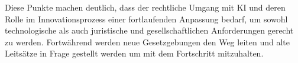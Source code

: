 Diese Punkte machen deutlich, 
dass der rechtliche Umgang mit KI und deren Rolle 
im Innovationsprozess einer fortlaufenden Anpassung bedarf, 
um sowohl technologische 
als auch juristische und gesellschaftlichen
Anforderungen gerecht zu werden. Fortwährend werden
neue Gesetzgebungen den Weg leiten und alte Leitsätze 
in Frage gestellt werden um mit dem Fortschritt mitzuhalten.




